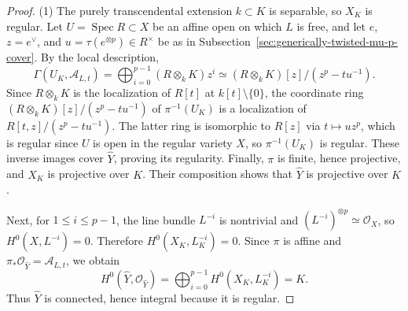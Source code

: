 \documentclass[10pt,abstract=true]{scrartcl}
\numberwithin{equation}{section}
\theoremstyle{definition}
\theoremstyle{remark}
\begin{document}
\begin{proof}
  (1) The purely transcendental extension $k\subset K$ is separable, so $X_K$ is regular.
  Let $U=\operatorname{Spec}R\subset X$ be an affine open on which $L$ is free, and let $e$, $z=e^\vee$, and $u=\tau(e^{\otimes p})\in R^\times$ be as in Subsection~\ref{sec:generically-twisted-mu-p-cover}.
  By the local description,
  \[
    \Gamma(U_K,\mathcal A_{L,t}) =\bigoplus_{i=0}^{p-1}(R\otimes_kK)z^i \simeq (R\otimes_kK)[z]/(z^p-tu^{-1}).
  \]
  Since $R\otimes_kK$ is the localization of $R[t]$ at $k[t]\setminus\{0\}$, the coordinate ring $(R\otimes_kK)[z]/(z^p-tu^{-1})$ of $\pi^{-1}(U_K)$ is a localization of $R[t,z]/(z^p-tu^{-1})$.
  The latter ring is isomorphic to $R[z]$ via $t\mapsto uz^p$, which is regular since $U$ is open in the regular variety $X$, so $\pi^{-1}(U_K)$ is regular.
  These inverse images cover $\widehat Y$, proving its regularity.
  Finally, $\pi$ is finite, hence projective, and $X_K$ is projective over $K$.
  Their composition shows that $\widehat Y$ is projective over $K$.

  Next, for $1\le i\le p-1$, the line bundle $L^{-i}$ is nontrivial and $(L^{-i})^{\otimes p}\simeq\mathcal O_X$, so $H^0(X,L^{-i})=0$.
  Therefore $H^0(X_K,L_K^{-i}) = 0$.
  Since $\pi$ is affine and $\pi_*\mathcal O_{\widehat Y}=\mathcal A_{L,t}$, we obtain \[
    H^0(\widehat Y,\mathcal O_{\widehat Y}) =\bigoplus_{i=0}^{p-1} H^0(X_K,L_K^{-i})=K.
  \]
  Thus $\widehat Y$ is connected, hence integral because it is regular.


\end{proof}
\end{document}
